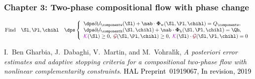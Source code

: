 \begin{frame}
\frametitle{Chapter 3: Two-phase compositional flow with phase change}
\vspace{-0.5 cm}
\begin{equation*}
\mbox{Find} \quad \Sl, \Pl, \chihl \quad \dps
\left\lbrace\begin{array}{llccc}
\dps \partial_t l_\componentw(\Sl) + \nab \cdot {\bm \Phi}_{\mathrm{w}}(\Sl,\Pl,\chihl) = Q_{\componentw},  \\
              \dps \partial_t l_\componenth(\Sl,\chihl)  + \nab \cdot {\bm \Phi}_{\mathrm{h}}(\Sl,\Pl,\chihl)=\Qh,\\
\textcolor{electricpurple}{\mathcal{K}}(\Sl) \geq 0, \;  \textcolor{carmine}{\mathcal{G}}(\Sl,\Pl,\chihl) \geq 0, \; \textcolor{electricpurple}{\mathcal{K}}(\Sl) \cdot \textcolor{carmine}{\mathcal{G}}(\Sl,\Pl,\chihl)=0  
\end{array}
\right.
\end{equation*}
\vspace{-0.3 cm}
\begin{figure}
\end{figure}
\vspace{-0.2 cm}
\begin{thebibliography}{10}
 \scriptsize{
 {\sc I.~Ben Gharbia, J.~Dabaghi, V.~Martin, and M.~Vohral{\'{\i}}k}, {\em A posteriori error estimates and adaptive stopping criteria for a compositional two-phase flow with nonlinear complementarity constraints}.
 \textcolor{black}{HAL Preprint~01919067, In revision, 2019}}
 \end{thebibliography}
\end{frame}
